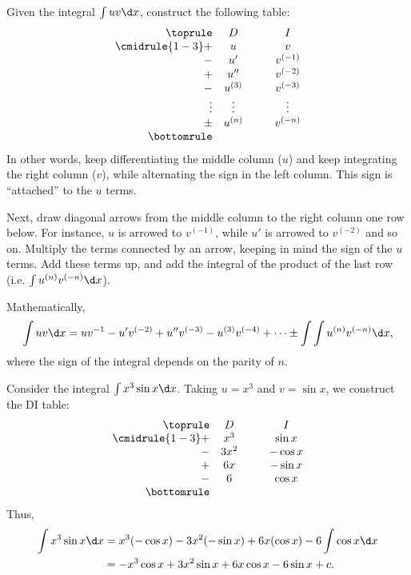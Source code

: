 \begin{recipe}[DI Method]
    Given the integral $\int uv \d x $, construct the following table:
    \[
    \begin{array}{r c @{\hspace*{1.0cm}} c}\toprule
        & D & I \\\cmidrule{1-3}
        + & u & v \\
        - & u' & v^{(-1)} \\
        + & u'' & v^{(-2)} \\
        - & u^{(3)} & v^{(-3)} \\
        \vdots & \vdots & \vdots \\
        \pm & u^{(n)} & v^{(-n)}\\\bottomrule
    \end{array}
    \]
    In other words, keep differentiating the middle column ($u$) and keep integrating the right column ($v$), while alternating the sign in the left column. This sign is ``attached'' to the $u$ terms.

    Next, draw diagonal arrows from the middle column to the right column one row below. For instance, $u$ is arrowed to $v^{(-1)}$, while $u'$ is arrowed to $v^{(-2)}$ and so on. Multiply the terms connected by an arrow, keeping in mind the sign of the $u$ terms. Add these terms up, and add the integral of the product of the last row (i.e. $\int u^{(n)} v^{(-n)} \d x$).

    Mathematically, \[\int uv \d x = u v^{-1} - u' v^{(-2)} + u'' v^{(-3)} - u^{(3)} v^{(-4)} + \dots \pm \int \int u^{(n)} v^{(-n)} \d x,\] where the sign of the integral depends on the parity of $n$.
\end{recipe}

\begin{example}[DI Method]
    Consider the integral $\int x^3 \sin x \d x$. Taking $u = x^3$ and $v = \sin x$, we construct the DI table:
    \[
    \begin{array}{r c @{\hspace*{1.0cm}} c}\toprule
        & D & I \\\cmidrule{1-3}
        + & x^3 & \sin x \\
        - & 3x^2 & -\cos x \\
        + & 6x & -\sin x\\
        - & 6 & \cos x\\\bottomrule
    \end{array}
    \]
    Thus,
    \begin{align*}
        \int x^3 \sin x \d x &= x^3 (-\cos x) - 3x^2(-\sin x) + 6x(\cos x) - 6\int \cos x \d x\\
        &= -x^3 \cos x + 3x^2 \sin x + 6x\cos x - 6\sin x + c.
    \end{align*}
\end{example}